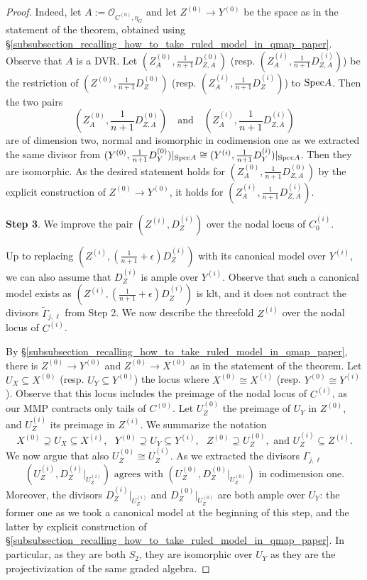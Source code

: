 \documentclass[a4paper,12pt]{amsart}
\newcommand{\cO}{{\mathcal{O}}}
\newcommand\spec{\text{\rm Spec}}
\theoremstyle{definition}
\theoremstyle{remark}
\begin{document}
\begin{proof}
     Indeed, let $A:=\cO_{C^{(0)},\eta_G}$ and let $Z^{(0)}\to Y^{(0)}$ be the space as in the statement of the theorem, obtained using \S \ref{subsubsection_recalling_how_to_take_ruled_model_in_qmap_paper}. Observe that $A$ is a DVR. Let $(Z^{(0)}_A,\frac{1}{n+1}D_{Z,A}^{(0)})$ (resp. $(Z^{(i)}_A,\frac{1}{n+1}D_{Z,A}^{(i)})$) be the restriction of $(Z^{(0)},\frac{1}{n+1}D_{Z}^{(0)})$ (resp. $(Z^{(i)}_A,\frac{1}{n+1}D_{Z}^{(i)})$) to $\spec A$. Then the two pairs \[\textstyle\left(Z^{(0)}_A,\frac{1}{n+1}D_{Z,A}^{(0)}\right) \ \ \ \text{ and } \ \ \ \left(Z^{(i)}_A,\frac{1}{n+1}D_{Z,A}^{(i)}\right)\] are of dimension two, normal and isomorphic in codimension one as we extracted the same divisor from $(Y^{(0)},\frac{1}{n+1}D_Y^{(0)})|_{\spec A}\cong(Y^{(i)},\frac{1}{n+1}D_Y^{(i)})|_{\spec A}$. Then they are isomorphic. As the desired statement holds for $(Z^{(0)}_A,\frac{1}{n+1}D_{Z,A}^{(0)})$ by the explicit construction of $Z^{(0)}\to Y^{(0)}$, it holds for $(Z^{(i)}_A,\frac{1}{n+1}D_{Z,A}^{(i)})$.

     \textbf{Step 3}. We improve the pair $(Z^{(i)},D_Z^{(i)})$ over the nodal locus of $C^{(i)}_0$.

     Up to replacing $(Z^{(i)},(\frac{1}{n+1} +\epsilon)D_Z^{(i)})$ with its canonical model over $Y^{(i)}$, we can also assume that $D_Z^{(i)}$ is ample over $Y^{(i)}$. Observe that such a canonical model exists as $(Z^{(i)},(\frac{1}{n+1} +\epsilon)D_Z^{(i)})$ is klt, and it does not contract the divisors $\widetilde{\Gamma}_{j,\ell}$ from Step 2. We now describe the threefold $Z^{(i)}$ over the nodal locus of $C^{(i)}$.


 By \S \ref{subsubsection_recalling_how_to_take_ruled_model_in_qmap_paper}, there is $Z^{(0)}\to Y^{(0)}$ and $Z^{(0)}\to X^{(0)}$ as in the statement of the theorem. Let $U_X\subseteq X^{(0)}$ (resp. $U_Y\subseteq Y^{(0)}$) the locus where $X^{(0)}\cong X^{(i)}$ (resp. $Y^{(0)}\cong Y^{(i)}$). Observe that this locus includes the preimage of the nodal locus of $C^{(i)}$,
 as our MMP contracts only tails of $C^{(0)}$. Let $U_{Z}^{(0)}$ the preimage of $U_Y$ in $Z^{(0)}$, and $U_{Z}^{(i)}$ its preimage in $Z^{(i)}$. We summarize the notation
 \[
 X^{(0)}\supseteq U_X \subseteq X^{(i)},\text{ } Y^{(0)}\supseteq U_Y \subseteq Y^{(i)},\text{ }Z^{(0)}\supseteq U_Z^{(0)}, \text{ and } U_Z^{(i)} \subseteq Z^{(i)}.
 \]We now argue that also $U_Z^{(0)}\cong U_Z^{(i)}$.
 As we extracted the divisors $\Gamma_{j,\ell}$\[ (U_{Z}^{(i)}, D_Z^{(i)}|_{U_Z^{(i)}})\text{ agrees with }(U_{Z}^{(0)}, D_Z^{(0)}|_{U_Z^{(0)}})\text{ in codimension one.}\] Moreover, the divisors $D_Z^{(i)}|_{U_{Z}^{(i)}}$
 and $D_Z^{(0)}|_{U_{Z}^{(0)}}$ are both ample over $U_Y$: the former one as we took a canonical model at the beginning of this step, and the latter by explicit construction of \S \ref{subsubsection_recalling_how_to_take_ruled_model_in_qmap_paper}. In particular, as they are both $S_2$, they are isomorphic over $U_Y$ as they are the projectivization of the same graded algebra.


\end{proof}
\end{document}
